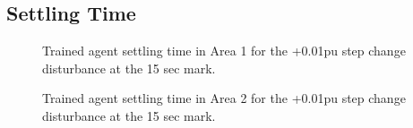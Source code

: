 \clearpage

\subsection{Settling Time}

\begin{figure}[h]
	\begin{minipage}[t]{0.50\textwidth}
		\centering
		\resizebox{7cm}{!}{}
		\caption{Trained agent settling time in Area 1 for the +0.01pu step change disturbance at the 15 sec mark.}
	\end{minipage}
	\hspace{0.25cm}
	\begin{minipage}[t]{0.50\textwidth}
		\resizebox{7cm}{!}{}
		\caption{Trained agent settling time in Area 2 for the +0.01pu step change disturbance at the 15 sec mark.}
	\end{minipage}
\end{figure}